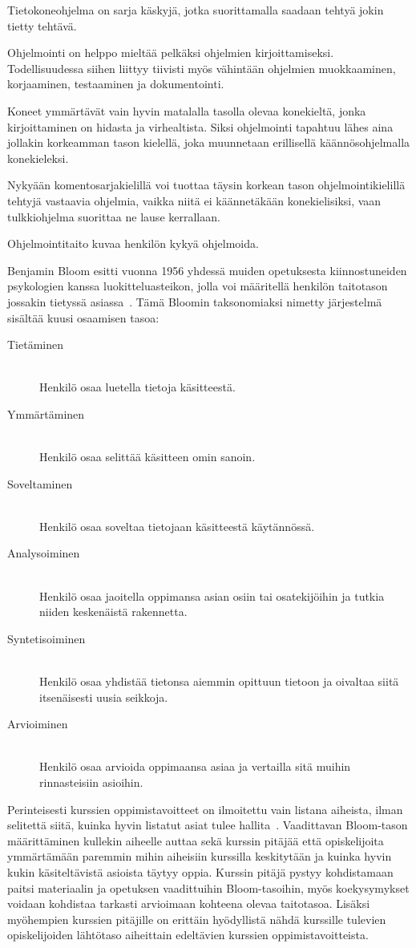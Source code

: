 \documentclass[finnish]{../tktltiki2}
\theoremstyle{definition}
\theoremstyle{remark}
\begin{document}
Tietokoneohjelma on sarja käskyjä, jotka suorittamalla saadaan tehtyä jokin tietty tehtävä.

Ohjelmointi on helppo mieltää pelkäksi ohjelmien kirjoittamiseksi. Todellisuudessa siihen liittyy tiivisti myös vähintään ohjelmien muokkaaminen, korjaaminen, testaaminen ja dokumentointi.

Koneet ymmärtävät vain hyvin matalalla tasolla olevaa konekieltä, jonka kirjoittaminen on hidasta ja virhealtista. Siksi ohjelmointi tapahtuu lähes aina jollakin korkeamman tason kielellä, joka muunnetaan erillisellä käännösohjelmalla konekieleksi.

Nykyään komentosarjakielillä voi tuottaa täysin korkean tason ohjelmointikielillä tehtyjä vastaavia ohjelmia, vaikka niitä ei käännetäkään konekielisiksi, vaan tulkkiohjelma suorittaa ne lause kerrallaan.

Ohjelmointitaito kuvaa henkilön kykyä ohjelmoida.


Benjamin Bloom esitti vuonna 1956 yhdessä muiden opetuksesta kiinnostuneiden psykologien kanssa luokitteluasteikon, jolla voi määritellä henkilön taitotason jossakin tietyssä asiassa~\cite{BLOOM56}. Tämä Bloomin taksonomiaksi nimetty järjestelmä sisältää kuusi osaamisen tasoa:

\begin{description}
  \item[Tietäminen] \hfill \\
  Henkilö osaa luetella tietoja käsitteestä.
  \item[Ymmärtäminen] \hfill \\
  Henkilö osaa selittää käsitteen omin sanoin.
  \item[Soveltaminen] \hfill \\
  Henkilö osaa soveltaa tietojaan käsitteestä käytännössä.
  \item[Analysoiminen] \hfill \\
  Henkilö osaa jaoitella oppimansa asian osiin tai osatekijöihin ja tutkia niiden keskenäistä rakennetta.
  \item[Syntetisoiminen] \hfill \\
  Henkilö osaa yhdistää tietonsa aiemmin opittuun tietoon ja oivaltaa siitä itsenäisesti uusia seikkoja.
  \item[Arvioiminen] \hfill \\
  Henkilö osaa arvioida oppimaansa asiaa ja vertailla sitä muihin rinnasteisiin asioihin.
\end{description}

Perinteisesti kurssien oppimistavoitteet on ilmoitettu vain listana aiheista, ilman selitettä siitä, kuinka hyvin listatut asiat tulee hallita~\cite{SMS08}. Vaadittavan Bloom-tason määrittäminen kullekin aiheelle auttaa sekä kurssin pitäjää että opiskelijoita ymmärtämään paremmin mihin aiheisiin kurssilla keskitytään ja kuinka hyvin kukin käsiteltävistä asioista täytyy oppia. Kurssin pitäjä pystyy kohdistamaan paitsi materiaalin ja opetuksen vaadittuihin Bloom-tasoihin, myös koekysymykset voidaan kohdistaa tarkasti arvioimaan kohteena olevaa taitotasoa. Lisäksi myöhempien kurssien pitäjille on erittäin hyödyllistä nähdä kurssille tulevien opiskelijoiden lähtötaso aiheittain edeltävien kurssien oppimistavoitteista.
\end{document}
